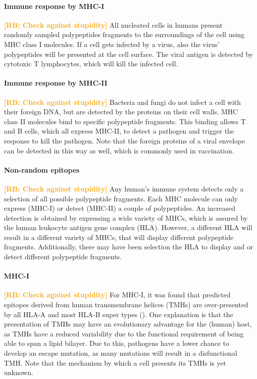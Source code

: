 \documentclass{article}
\newcommand{\richel}[1]{\textcolor{orange}{\textbf{[RB: #1]}}}
\begin{document}
\paragraph{Immune response by MHC-I}

\richel{Check against stupidity}
All nucleated cells in humans present randomly sampled polypeptides
fragments to the surroundings of the cell using MHC class I molecules.
If a cell gets infected by a virus, also the virus' polypeptides
will be presented at the cell surface. The viral antigen is detected 
by cytotoxic T lymphocytes, which will kill the infected cell.

\paragraph{Immune response by MHC-II}

\richel{Check against stupidity}
Bacteria and fungi do not infect a cell with their foreign DNA,
but are detected by the proteins on their cell walls. MHC class II molecules 
bind to specific polypeptide fragments. This binding allows T and B cells,
which all express MHC-II, to detect a pathogen and trigger the response to
kill the pathogen. Note that the foreign proteins of a viral envelope 
can be detected in this way as well, which is commonly used in vaccination.

\paragraph{Non-random epitopes}

\richel{Check against stupidity}
Any human's immune system detects only a selection of all possible
polypeptide fragments. Each MHC molecule can only express (MHC-I)
or detect (MHC-II) a couple of polypeptides. An increased detection
is obtained by expressing a wide variety of
MHCs, which is assured by the human leukocyte antigen gene complex (HLA).
However, a different HLA will result in a different variety of MHCs,
that will display different polypeptide fragments. Additionally, there
may have been selection the HLA to display and or detect different
polypeptide fragments.

\paragraph{MHC-I}

\richel{Check against stupidity}
For MHC-I, it was found that predicted epitopes derived 
from human transmembrane helices (TMHs)
are over-presented by all HLA-A and 
most HLA-B super types (\cite{bianchi2017}). 
One explanation is that the presentation of TMHs 
may have an evolutionary advantage for 
the (human) host, as TMHs have a reduced variability 
due to the functional requirement of being able to span a lipid 
bilayer. 
Due to this, pathogens have a lower chance to develop an escape mutation,
as many mutations will result in a disfunctional TMH.
Note that the mechanism by which a cell presents its TMHs is
yet unknown.
\end{document}
